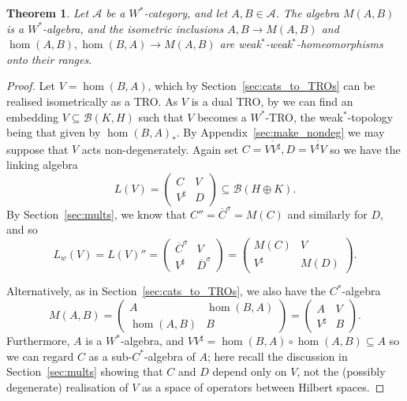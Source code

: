 \documentclass[a4paper,11pt]{article}
\theoremstyle{plain}
\newtheorem{theorem}[proposition]{Theorem}
\theoremstyle{remark}
\newcommand{\mc}[1]{\mathcal{#1}}
\begin{document}
\begin{theorem}\label{thm:main}
Let $\mc A$ be a $W^*$-category, and let $A,B \in \mc A$.  The algebra $M(A,B)$ is a $W^*$-algebra, and the isometric inclusions $A, B \to M(A,B)$ and $\hom(A,B), \hom(B,A) \to M(A,B)$ are weak$^*$-weak$^*$-homeomorphisms onto their ranges.
\end{theorem}
\begin{proof}
Let $V = \hom(B,A)$, which by Section~\ref{sec:cats_to_TROs} can be realised isometrically as a TRO.  As $V$ is a dual TRO, by \cite[Theorem~2.6]{EOR_InjectivityNuclearityOS} we can find an embedding $V \subseteq \mc B(K,H)$ such that $V$ becomes a $W^*$-TRO, the weak$^*$-topology being that given by $\hom(B,A)_*$.  By Appendix~\ref{sec:make_nondeg} we may suppose that $V$ acts non-degenerately.  Again set $C = \overline{V V^\sharp}, D=\overline{V^\sharp V}$ so we have the linking algebra
\[ L(V) = \begin{pmatrix} C & V \\ V^\sharp & D \end{pmatrix} \subseteq \mc B(H\oplus K). \]
By Section~\ref{sec:mults}, we know that $C'' = \overline{C}^\sigma = M(C)$ and similarly for $D$, and so
\[ L_w(V) = L(V)'' = \begin{pmatrix} \overline{C}^\sigma & V \\ V^\sharp & \overline{D}^\sigma \end{pmatrix}
= \begin{pmatrix} M(C) & V \\ V^\sharp & M(D) \end{pmatrix}. \]

Alternatively, as in Section~\ref{sec:cats_to_TROs}, we also have the $C^*$-algebra
\[ M(A,B) = \begin{pmatrix} A & \hom(B,A) \\ \hom(A,B) & B \end{pmatrix}
= \begin{pmatrix} A & V \\ V^\sharp & B \end{pmatrix}. \]
Furthermore, $A$ is a $W^*$-algebra, and $VV^\sharp = \hom(B,A)\circ\hom(A,B) \subseteq A$ so we can regard $C$ as a sub-$C^*$-algebra of $A$; here recall the discussion in Section~\ref{sec:mults} showing that $C$ and $D$ depend only on $V$, not the (possibly degenerate) realisation of $V$ as a space of operators between Hilbert spaces.


\end{proof}
\end{document}
